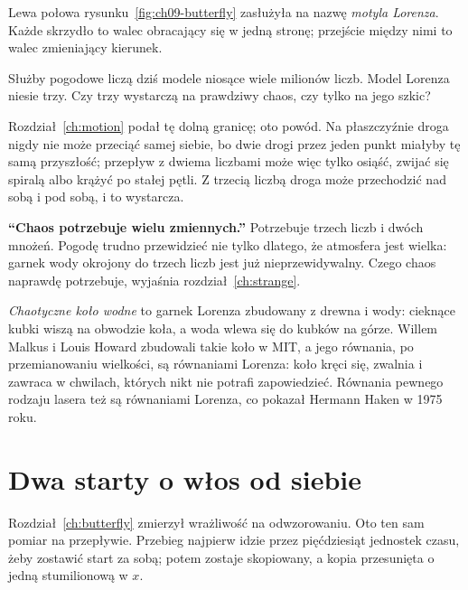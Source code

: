 \noindent
Lewa połowa rysunku~\ref{fig:ch09-butterfly} zasłużyła na nazwę
\emph{motyla Lorenza}. Każde skrzydło to walec obracający się w jedną stronę;
przejście między nimi to walec zmieniający kierunek.

\begin{think}
Służby pogodowe liczą dziś modele niosące wiele milionów liczb. Model
Lorenza niesie trzy. Czy trzy wystarczą na prawdziwy chaos, czy tylko na
jego szkic?
\end{think}
Rozdział~\ref{ch:motion} podał tę dolną granicę; oto powód. Na płaszczyźnie
droga nigdy nie może przeciąć samej siebie, bo dwie drogi przez jeden punkt
miałyby tę samą przyszłość; przepływ z dwiema liczbami może więc tylko
osiąść, zwijać się spiralą albo krążyć po stałej pętli. Z trzecią liczbą
droga może przechodzić nad sobą i pod sobą, i to wystarcza.

\begin{trapbox}
\textbf{\enquote{Chaos potrzebuje wielu zmiennych.}} Potrzebuje trzech liczb
i dwóch mnożeń. Pogodę trudno przewidzieć nie tylko dlatego, że atmosfera
jest wielka: garnek wody okrojony do trzech liczb jest już
nieprzewidywalny. Czego chaos naprawdę potrzebuje, wyjaśnia
rozdział~\ref{ch:strange}.
\end{trapbox}

\begin{worldbox}
\emph{Chaotyczne koło wodne} to garnek Lorenza zbudowany z drewna i wody:
cieknące kubki wiszą na obwodzie koła, a woda wlewa się do kubków na górze.
Willem Malkus i Louis Howard zbudowali takie koło w MIT, a jego równania, po
przemianowaniu wielkości, są równaniami Lorenza: koło kręci się, zwalnia i
zawraca w chwilach, których nikt nie potrafi zapowiedzieć. Równania pewnego
rodzaju lasera też są równaniami Lorenza, co pokazał Hermann Haken w 1975
roku.
\end{worldbox}

\section{Dwa starty o włos od siebie}
\label{sec:ch09-apart}

\noindent
Rozdział~\ref{ch:butterfly} zmierzył wrażliwość na odwzorowaniu. Oto ten sam
pomiar na przepływie. Przebieg najpierw idzie przez pięćdziesiąt jednostek
czasu, żeby zostawić start za sobą; potem zostaje skopiowany, a kopia
przesunięta o jedną stumilionową w $x$.

